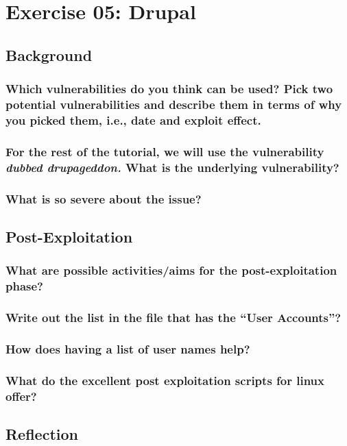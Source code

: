 \section{Exercise 05: Drupal}
\subsection{Background}
\subsubsection{Which vulnerabilities do you think can be used? Pick two potential vulnerabilities and describe them in terms of why you picked them, i.e., date and exploit effect.}
\subsubsection{For the rest of the tutorial, we will use the vulnerability \textit{dubbed drupageddon.} What is the underlying vulnerability?}
\subsubsection{What is so severe about the issue?}

\subsection{Post-Exploitation}

\subsubsection{What are possible activities/aims for the post-exploitation phase?}
\subsubsection{Write out the list in the file that has the “User Accounts”?}
\subsubsection{How does having a list of user names help?}
\subsubsection{What do the excellent post exploitation scripts for linux offer?}

\subsection{Reflection}

